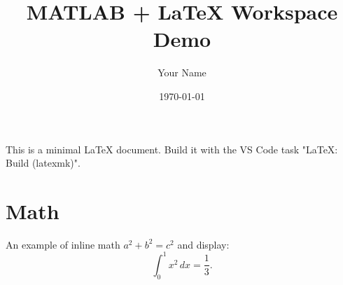 \documentclass[11pt]{article}
\title{MATLAB + LaTeX Workspace Demo}
\author{Your Name}
\date{\today}
\begin{document}
\maketitle

This is a minimal LaTeX document. Build it with the VS Code task "LaTeX: Build (latexmk)".

\section{Math}
An example of inline math $a^2 + b^2 = c^2$ and display:
\begin{equation}
\int_0^1 x^2\,dx = \frac{1}{3}.
\end{equation}
\end{document}
